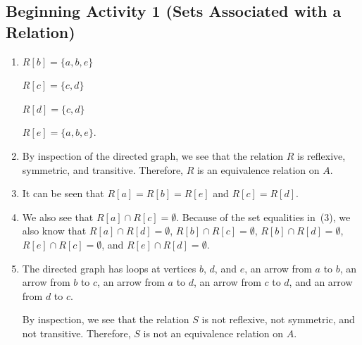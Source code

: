\documentclass[11pt]{article}
\begin{document}
\subsection*{Beginning Activity 1 (Sets Associated with a Relation)}
\begin{enumerate}
  \item \begin{multicols}{4}
  $R[b] = \{ a, b, e \}$

  $R[c] = \{ c, d \}$

  $R[d] = \{ c, d \}$

  $R[e] = \{ a, b, e \}$.
\end{multicols}
\item %
By inspection of the directed graph, we see that the relation  $R$  is reflexive, symmetric, and transitive.  Therefore,  $R$  is an equivalence relation on  $A$.

\item It can be seen that $R[a] = R[b] = R[e]$ and $R[c] = R[d]$.

\item We also see that $R[a] \cap R[c] = \emptyset$.  Because of the set equalities in~(3), we also know that 
$R[a] \cap R[d] = \emptyset$, $R[b] \cap R[c] = \emptyset$, $R[b] \cap R[d] = \emptyset$, $R[e] \cap R[c] = \emptyset$, and 
$R[e] \cap R[d] = \emptyset$.

\item The directed graph has loops at vertices $b$, $d$, and $e$, an arrow from $a$ to $b$, an arrow from $b$ to $c$, an arrow from $a$ to $d$, an arrow from $c$ to $d$, and an arrow from $d$ to $c$.

By inspection, we see that the relation  $S$  is not reflexive, not symmetric, and not transitive.  Therefore,  $S$  is not an equivalence relation on  $A$.

%
%
%
%
%
%


\end{enumerate}
\end{document}
